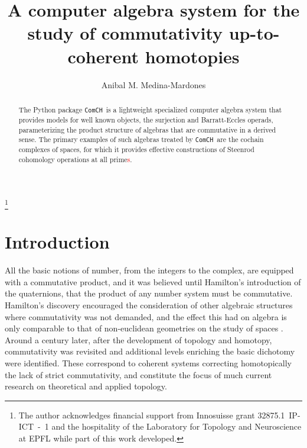 \documentclass{amsart}
\newcommand{\comch}{\texttt{ComCH}}
\newcommand{\rev}[1]{\textcolor{red}{#1}} %
\begin{document}
	
\title[A C.A.S. for the study of commutativity up-to-coherent homotopies]{A computer algebra system for the study of commutativity up-to-coherent homotopies}
\author{Anibal M. Medina-Mardones}
\address{Max Plank Institute for Mathematics, Bonn, Germany}
\address{Department of Mathematics, University of Notre Dame, Notre Dame, IN, USA}
\thanks{The author acknowledges financial support from Innosuisse grant \mbox{32875.1 IP-ICT - 1} and the hospitality of the Laboratory for Topology and Neuroscience at EPFL while part of this work developed.}

\begin{abstract}
	The Python package \comch\, is a lightweight specialized computer algebra system that provides models for well known objects, the surjection and Barratt-Eccles operads, parameterizing the product structure of algebras that are commutative in a derived sense. The primary examples of such algebras treated by \comch\, are the cochain complexes of spaces, for which it provides effective constructions of Steenrod cohomology operations at all prime\rev{s}.
\end{abstract} 

\vspace*{-.8cm}

\maketitle

\section{Introduction}

All the basic notions of number, from the integers to the complex, are equipped with a commutative product, and it was believed until Hamilton's introduction of the quaternions, that the product of any number system must be commutative.
Hamilton's discovery encouraged the consideration of other algebraic structures where commutativity was not demanded, and the effect this had on algebra is only comparable to that of non-euclidean geometries on the study of spaces \cite[Ch.V]{Kline1982}.
Around a century later, after the development of topology and homotopy, commutativity was revisited and additional levels enriching the basic dichotomy were identified.
These correspond to coherent systems correcting homotopically the lack of strict commutativity, and constitute the focus of much current research on theoretical and applied topology.
\end{document}
